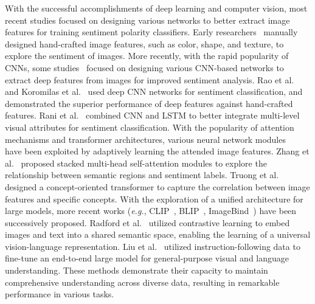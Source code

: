 With the successful accomplishments of deep learning and computer vision, most recent studies focused on designing various networks to better extract image features for training sentiment polarity classifiers.
Early researchers~\cite{lu2012shape, zhao2014exploring, katsurai2016image} manually designed hand-crafted image features, such as color, shape, and texture, to explore the sentiment of images.
More recently, with the rapid popularity of CNNs, some studies~\cite{liang2021cross, yang2018weakly} focused on designing various CNN-based networks to extract deep features from images for improved sentiment analysis. 
Rao et al.~\cite{rao2020learning} and Koromilas et al.~\cite{koromilas2023mmatr}
used deep CNN networks for sentiment classification, and demonstrated the superior performance of deep features against hand-crafted features.
Rani et al.~\cite{rani2022efficient} combined CNN and LSTM to better integrate multi-level visual attributes for sentiment classification. 
With the popularity of attention mechanisms and transformer architectures, various neural network modules ~\cite{zhang2022image, 9102855, zhang2023learning, feng2024caption, ruan2021dae, truong2023concept} have been exploited by adaptively learning the attended image features.
Zhang et al.~\cite{zhang2022image} proposed stacked multi-head self-attention modules to explore the relationship between semantic regions and sentiment labels.
Truong et al.~\cite{truong2023concept} designed a concept-oriented transformer to capture the correlation between image features and specific concepts.
With the exploration of a unified architecture for large models, more recent works (\textit{e.g.}, CLIP~\cite{radford2021learning}, BLIP~\cite{li2022blip}, ImageBind~\cite{girdhar2023imagebind}) have been successively proposed.
Radford et al.~\cite{radford2021learning} utilized contrastive learning to embed images and text into a shared semantic space, enabling the learning of a universal vision-language representation.
Liu et al.~\cite{liu2024visual} utilized instruction-following data to fine-tune an end-to-end large model for general-purpose visual and language understanding.
These methods demonstrate their capacity to maintain comprehensive understanding across diverse data, resulting in remarkable performance in various tasks.



